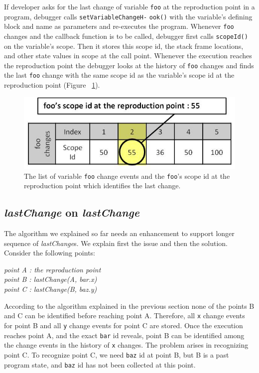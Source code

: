\documentclass[preprint]{sigplanconf}
\begin{document}
If developer asks for the last change of variable \texttt{foo} at the 
reproduction point in a program, debugger calls 
\texttt{setVariableChangeH-} \texttt{ook()} with the variable's defining
block and name as parameters and re-executes the
program. Whenever \texttt{foo} changes and the callback function is to
be called, debugger first calls \texttt{scopeId()} on the
variable's scope. Then it stores this scope id, the stack
frame locations, and other state values in scope at the call point.
Whenever the execution reaches the reproduction point the debugger
looks at the history of \texttt{foo} changes and finds the last
\texttt{foo} change with the same scope id as the variable's scope id
at the reproduction point (Figure ~\ref{fig:foo-changes2}). 


\begin{figure}[htp]
\includegraphics[width=.48\textwidth]{7-foo-changes2.jpg}
\caption{The list of variable \texttt{foo} change events and the
  \texttt{foo}'s scope id at the reproduction point which identifies
  the last change.}
\label{fig:foo-changes2}
\end{figure}

 
\subsection{\textit{lastChange} on \textit{lastChange}}
The algorithm we explained so far needs an enhancement to support
longer sequence of \textit{lastChange}s. We explain first the issue
and then the solution. Consider the following points:

\begin{center}
\textit{
 point A : the reproduction point \\
 point B : lastChange(A, bar.x) \\
 point C : lastChange(B, baz.y) 
 }
 \end{center}
According to the algorithm explained in the previous section none of
the points B and C can be identified before reaching point
A. Therefore, all \texttt{x} change events for point B and all \texttt{y}
change events for point C are stored. Once the execution reaches point A,
and the exact \texttt{bar} id reveals, point B can be identified among
the change events in the history of \texttt{x} changes. The problem
arises in recognizing point C. To recognize point C, we need
\texttt{baz} id at point B, but B is a past program state, and
\texttt{baz} id has not been collected at this point.
\end{document}
